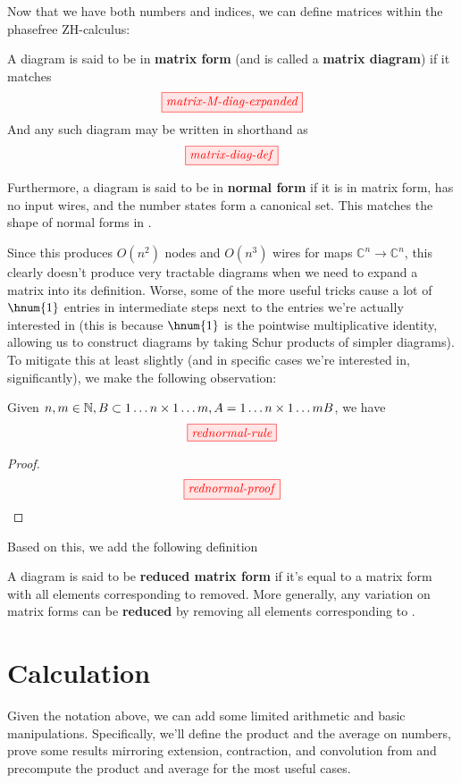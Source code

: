 Now that we have both numbers and indices, we can define matrices within the
phasefree ZH-calculus:
\begin{definition}\label{def:matrix-form}
    A diagram is said to be in \textbf{matrix form} (and is called a
    \textbf{matrix diagram}) if it matches
    $$\tikzfig{matrix-M-diag-expanded}$$
    And any such diagram may be written in shorthand as 
    $$\tikzfig{matrix-diag-def}$$

    Furthermore, a diagram is said to be in \textbf{normal form} if it is in
    matrix form, has no input wires, and the number states form a canonical set.
    This matches the shape of normal forms in \cite{backens2018zhcalculus}.
\end{definition}

Since this produces $O(n^2)$ nodes and $O(n^3)$ wires for maps $\mathbb{C}^n
\rightarrow \mathbb{C}^n$, this clearly doesn't produce very tractable diagrams
when we need to expand a matrix into its definition. Worse, some of the more
useful tricks cause a lot of $\hnum{1}$ entries in intermediate steps next to
the entries we're actually interested in (this is because $\hnum{1}$ is the
pointwise multiplicative identity, allowing us to construct diagrams by taking
Schur products of simpler diagrams). To mitigate this at least slightly (and in
specific cases we're interested in, significantly), we make the following
observation: 
\begin{lemma}
    Given $n,m \in \mathbb{N}, B \subset {1 \ldots n} \times {1 \ldots m}, A =
    {1 \ldots n} \times {1 \ldots m}\\B$, we have 
    $$\tikzfig{rednormal-rule}$$
\end{lemma}
\begin{proof}
    $$\tikzfig{rednormal-proof}$$
\end{proof}

Based on this, we add the following definition
\begin{definition}
    A diagram is said to be \textbf{reduced matrix form} if it's equal to a
    matrix form with all elements corresponding to  removed. More
    generally, any variation on matrix forms can be \textbf{reduced} by removing
    all elements corresponding to .
\end{definition}

\section{Calculation}\label{sec:calculation}
Given the notation above, we can add some limited arithmetic and basic
manipulations. Specifically, we'll define the product and the average on
numbers, prove some results mirroring extension, contraction, and convolution
from \cite{backens2018zhcalculus} and precompute the product and average for the
most useful cases.

